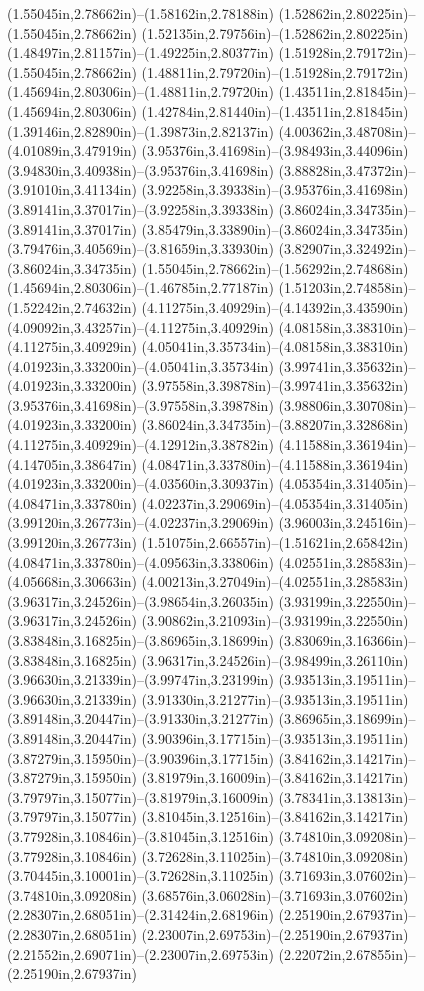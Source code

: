 (1.55045in,2.78662in)--(1.58162in,2.78188in) (1.52862in,2.80225in)--(1.55045in,2.78662in) (1.52135in,2.79756in)--(1.52862in,2.80225in) (1.48497in,2.81157in)--(1.49225in,2.80377in) (1.51928in,2.79172in)--(1.55045in,2.78662in) (1.48811in,2.79720in)--(1.51928in,2.79172in) (1.45694in,2.80306in)--(1.48811in,2.79720in) (1.43511in,2.81845in)--(1.45694in,2.80306in) (1.42784in,2.81440in)--(1.43511in,2.81845in) (1.39146in,2.82890in)--(1.39873in,2.82137in) (4.00362in,3.48708in)--(4.01089in,3.47919in) (3.95376in,3.41698in)--(3.98493in,3.44096in) (3.94830in,3.40938in)--(3.95376in,3.41698in) (3.88828in,3.47372in)--(3.91010in,3.41134in) (3.92258in,3.39338in)--(3.95376in,3.41698in) (3.89141in,3.37017in)--(3.92258in,3.39338in) (3.86024in,3.34735in)--(3.89141in,3.37017in) (3.85479in,3.33890in)--(3.86024in,3.34735in) (3.79476in,3.40569in)--(3.81659in,3.33930in) (3.82907in,3.32492in)--(3.86024in,3.34735in) (1.55045in,2.78662in)--(1.56292in,2.74868in) (1.45694in,2.80306in)--(1.46785in,2.77187in) (1.51203in,2.74858in)--(1.52242in,2.74632in) (4.11275in,3.40929in)--(4.14392in,3.43590in) (4.09092in,3.43257in)--(4.11275in,3.40929in) (4.08158in,3.38310in)--(4.11275in,3.40929in) (4.05041in,3.35734in)--(4.08158in,3.38310in) (4.01923in,3.33200in)--(4.05041in,3.35734in) (3.99741in,3.35632in)--(4.01923in,3.33200in) (3.97558in,3.39878in)--(3.99741in,3.35632in) (3.95376in,3.41698in)--(3.97558in,3.39878in) (3.98806in,3.30708in)--(4.01923in,3.33200in) (3.86024in,3.34735in)--(3.88207in,3.32868in) (4.11275in,3.40929in)--(4.12912in,3.38782in) (4.11588in,3.36194in)--(4.14705in,3.38647in) (4.08471in,3.33780in)--(4.11588in,3.36194in) (4.01923in,3.33200in)--(4.03560in,3.30937in) (4.05354in,3.31405in)--(4.08471in,3.33780in) (4.02237in,3.29069in)--(4.05354in,3.31405in) (3.99120in,3.26773in)--(4.02237in,3.29069in) (3.96003in,3.24516in)--(3.99120in,3.26773in) (1.51075in,2.66557in)--(1.51621in,2.65842in) (4.08471in,3.33780in)--(4.09563in,3.33806in) (4.02551in,3.28583in)--(4.05668in,3.30663in) (4.00213in,3.27049in)--(4.02551in,3.28583in) (3.96317in,3.24526in)--(3.98654in,3.26035in) (3.93199in,3.22550in)--(3.96317in,3.24526in) (3.90862in,3.21093in)--(3.93199in,3.22550in) (3.83848in,3.16825in)--(3.86965in,3.18699in) (3.83069in,3.16366in)--(3.83848in,3.16825in) (3.96317in,3.24526in)--(3.98499in,3.26110in) (3.96630in,3.21339in)--(3.99747in,3.23199in) (3.93513in,3.19511in)--(3.96630in,3.21339in) (3.91330in,3.21277in)--(3.93513in,3.19511in) (3.89148in,3.20447in)--(3.91330in,3.21277in) (3.86965in,3.18699in)--(3.89148in,3.20447in) (3.90396in,3.17715in)--(3.93513in,3.19511in) (3.87279in,3.15950in)--(3.90396in,3.17715in) (3.84162in,3.14217in)--(3.87279in,3.15950in) (3.81979in,3.16009in)--(3.84162in,3.14217in) (3.79797in,3.15077in)--(3.81979in,3.16009in) (3.78341in,3.13813in)--(3.79797in,3.15077in) (3.81045in,3.12516in)--(3.84162in,3.14217in) (3.77928in,3.10846in)--(3.81045in,3.12516in) (3.74810in,3.09208in)--(3.77928in,3.10846in) (3.72628in,3.11025in)--(3.74810in,3.09208in) (3.70445in,3.10001in)--(3.72628in,3.11025in) (3.71693in,3.07602in)--(3.74810in,3.09208in) (3.68576in,3.06028in)--(3.71693in,3.07602in) (2.28307in,2.68051in)--(2.31424in,2.68196in) (2.25190in,2.67937in)--(2.28307in,2.68051in) (2.23007in,2.69753in)--(2.25190in,2.67937in) (2.21552in,2.69071in)--(2.23007in,2.69753in) (2.22072in,2.67855in)--(2.25190in,2.67937in) 